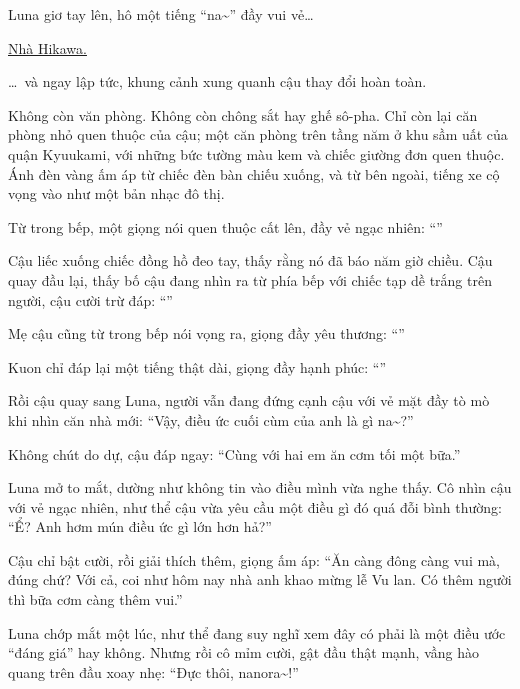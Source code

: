 \documentclass[../main.tex]{subfiles}
\begin{document}
Luna giơ tay lên, hô một tiếng ``na\~{}'' đầy vui vẻ\dots

\begin{center}
  \uline{Nhà Hikawa.}
\end{center}

\dots\ và ngay lập tức, khung cảnh xung quanh cậu thay đổi hoàn toàn.

Không còn văn phòng. Không còn chông sắt hay ghế sô-pha. Chỉ còn lại căn phòng nhỏ quen thuộc của cậu; một căn phòng trên tầng năm ở khu sầm uất của quận Kyuukami, với những bức tường màu kem và chiếc giường đơn quen thuộc. Ánh đèn vàng ấm áp từ chiếc đèn bàn chiếu xuống, và từ bên ngoài, tiếng xe cộ vọng vào như một bản nhạc đô thị.

Từ trong bếp, một giọng nói quen thuộc cất lên, đầy vẻ ngạc nhiên: ``''

Cậu liếc xuống chiếc đồng hồ đeo tay, thấy rằng nó đã báo năm giờ chiều. Cậu quay đầu lại, thấy bố cậu đang nhìn ra từ phía bếp với chiếc tạp dề trắng trên người, cậu cười trừ đáp: ``''

Mẹ cậu cũng từ trong bếp nói vọng ra, giọng đầy yêu thương: ``''

Kuon chỉ đáp lại một tiếng thật dài, giọng đầy hạnh phúc: ``''

Rồi cậu quay sang Luna, người vẫn đang đứng cạnh cậu với vẻ mặt đầy tò mò khi nhìn căn nhà mới: ``Vậy, điều ức cuối cùm của anh là gì na\~{}?''

Không chút do dự, cậu đáp ngay: ``Cùng với hai em ăn cơm tối một bữa.''

Luna mở to mắt, dường như không tin vào điều mình vừa nghe thấy. Cô nhìn cậu với vẻ ngạc nhiên, như thể cậu vừa yêu cầu một điều gì đó quá đỗi bình thường: ``Ể? Anh hơm mún điều ức gì lớn hơn hả?''

Cậu chỉ bật cười, rồi giải thích thêm, giọng ấm áp: ``Ăn càng đông càng vui mà, đúng chứ? Với cả, coi như hôm nay nhà anh khao mừng lễ Vu lan. Có thêm người thì bữa cơm càng thêm vui.''

Luna chớp mắt một lúc, như thể đang suy nghĩ xem đây có phải là một điều ước ``đáng giá'' hay không. Nhưng rồi cô mỉm cười, gật đầu thật mạnh, vầng hào quang trên đầu xoay nhẹ: ``Đực thôi, nanora\~{}!''
\end{document}
